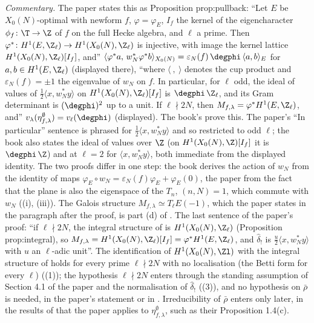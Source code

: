 \noindent\emph{Commentary.} The paper states this as Proposition prop:pullback: ``Let $E$ be $X_0(N)$-optimal with newform $f$, $\varphi=\varphi_E$, $I_f$ the kernel of the eigencharacter
$\phi_f\colon\T\to\Z$ of $f$ on the full Hecke algebra, and $\ell$ a prime. Then $\varphi^*\colon H^1(E,\Z_\ell)\to H^1(X_0(N),\Z_\ell)$ is injective, with image the kernel lattice
$H^1(X_0(N),\Z_\ell)[I_f]$, and'' $\langle\varphi^*a,\,w_N^*\varphi^*b\rangle_{X_0(N)}=\varepsilon_N(f)\,\degphi\,\langle a,b\rangle_E$ for $a,b\in H^1(E,\Z_\ell)$ (displayed there), ``where $\langle\ ,\ \rangle$
denotes the cup product and $\varepsilon_N(f)=\pm1$ the eigenvalue of $w_N$ on $f$. In particular, for $\ell$ odd, the ideal of values of
$\frac12\langle x,w_N^*y\rangle$ on $H^1(X_0(N),\Z_\ell)[I_f]$ is $\degphi\,\Z_\ell$, and its Gram determinant is $(\degphi)^2$ up to a unit. If $\ell\nmid2N$, then $M_{f,\lambda}=\varphi^*H^1(E,\Z_\ell)$, and''
$v_\lambda(\eta^\emptyset_{f,\lambda})=v_\ell(\degphi)$ (displayed). The book's
 prove this. The paper's ``In particular'' sentence is phrased for $\frac12\langle x,w_N^*y\rangle$ and so restricted to
odd $\ell$; the book also states the ideal of values over $\Z$ (on $H^1(X_0(N),\Z)[I_f]$ it is $\degphi\,\Z$) and at $\ell=2$ for $\langle x,w_N^*y\rangle$, both immediate from the displayed
identity. The two proofs differ in one step: the book derives the action of $w_N$ from the identity of maps $\varphi_E\circ w_N=\varepsilon_N(f)\varphi_E+\varphi_E(0)$, the paper from the fact that
the plane is also the eigenspace of the $T_n$, $(n,N)=1$, which commute with $w_N$ ((i), (iii)). The Galois structure $M_{f,\lambda}\simeq T_\ell E(-1)$, which the paper
states in the paragraph after the proof, is part (d) of . The last sentence of the paper's proof: ``if $\ell\nmid2N$, the integral structure of \cite{DFG04} is
$H^1(X_0(N),\Z_\ell)$ (Proposition prop:integral), so $M_{f,\lambda}=H^1(X_0(N),\Z_\ell)[I_f]=\varphi^*H^1(E,\Z_\ell)$, and $\hat\delta_!$ is $\frac u2\langle x,w_N^*y\rangle$ with $u$ an
$\ell$-adic unit''. The identification of $H^1(X_0(N),\Zl)$ with the integral structure of \cite{DFG04} holds for every prime $\ell\nmid2N$ with no localisation (the Betti form for every $\ell$) ((1));
the hypothesis $\ell\nmid2N$ enters through the standing assumption of Section 4.1 of the paper and the normalisation of $\hat\delta_!$ ((3)), and no
hypothesis on $\bar\rho$ is needed, in the paper's statement or in . Irreducibility of $\bar\rho$ enters only later, in the results of \cite{DFG04} that the paper applies
to $\eta^\emptyset_{f,\lambda}$, such as their Proposition 1.4(c).

